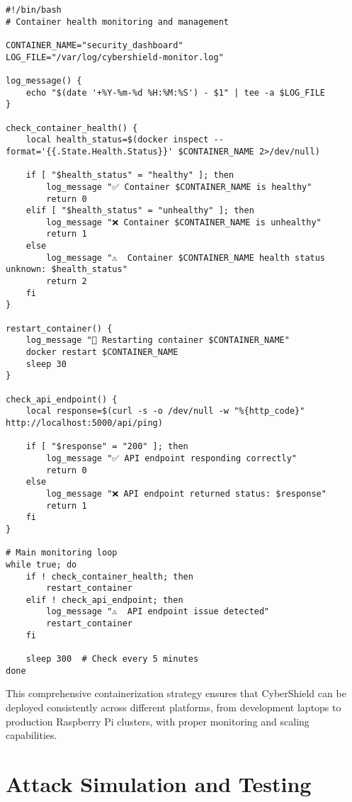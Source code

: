 \documentclass[12pt,a4paper]{report}
\begin{document}
\begin{lstlisting}[style=bashstyle, caption=Container Health Monitoring Script]
#!/bin/bash
# Container health monitoring and management

CONTAINER_NAME="security_dashboard"
LOG_FILE="/var/log/cybershield-monitor.log"

log_message() {
    echo "$(date '+%Y-%m-%d %H:%M:%S') - $1" | tee -a $LOG_FILE
}

check_container_health() {
    local health_status=$(docker inspect --format='{{.State.Health.Status}}' $CONTAINER_NAME 2>/dev/null)
    
    if [ "$health_status" = "healthy" ]; then
        log_message "✅ Container $CONTAINER_NAME is healthy"
        return 0
    elif [ "$health_status" = "unhealthy" ]; then
        log_message "❌ Container $CONTAINER_NAME is unhealthy"
        return 1
    else
        log_message "⚠️  Container $CONTAINER_NAME health status unknown: $health_status"
        return 2
    fi
}

restart_container() {
    log_message "🔄 Restarting container $CONTAINER_NAME"
    docker restart $CONTAINER_NAME
    sleep 30
}

check_api_endpoint() {
    local response=$(curl -s -o /dev/null -w "%{http_code}" http://localhost:5000/api/ping)
    
    if [ "$response" = "200" ]; then
        log_message "✅ API endpoint responding correctly"
        return 0
    else
        log_message "❌ API endpoint returned status: $response"
        return 1
    fi
}

# Main monitoring loop
while true; do
    if ! check_container_health; then
        restart_container
    elif ! check_api_endpoint; then
        log_message "⚠️  API endpoint issue detected"
        restart_container
    fi
    
    sleep 300  # Check every 5 minutes
done
\end{lstlisting}

This comprehensive containerization strategy ensures that CyberShield can be deployed consistently across different platforms, from development laptops to production Raspberry Pi clusters, with proper monitoring and scaling capabilities.

\chapter{Attack Simulation and Testing}
\end{document}

